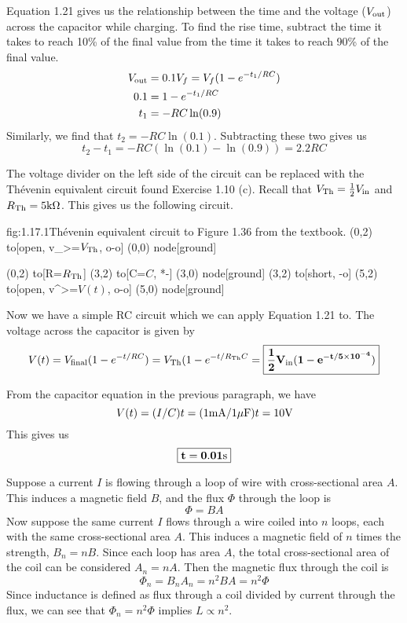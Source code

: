 \documentclass{article}
\begin{document}
    Equation 1.21 gives us the relationship between the time and the voltage ($V_{\text{out}}$) across the capacitor while charging. To find the rise time, subtract the time it takes to reach 10\% of the final value from the time it takes to reach 90\% of the final value.
    \begin{align*}
        V_{\text{out}} &= 0.1V_f = V_f(1-e^{-t_1/RC}) \\
        0.1 &= 1 - e^{-t_1/RC}\\ 
        t_1 &= -RC \ln(0.9)
    \end{align*}
    Similarly, we find that $t_2 = -RC \ln(0.1)$. Subtracting these two gives us 
    \[t_2 - t_1 = -RC(\ln(0.1) - \ln(0.9)) = 2.2RC\]

    The voltage divider on the left side of the circuit can be replaced with the Th\'evenin equivalent circuit found Exercise 1.10 (c). Recall that $V_{\text{Th}} = \frac{1}{2} V_{\text{in}}$ and $R_{\text{Th}} = 5\text{k}\Omega$. This gives us the following circuit.
    \begin{circuit}{fig:1.17.1}{Th\'evenin equivalent circuit to Figure 1.36 from the textbook.}
        (0,2) to[open, v_>=$V_{\text{Th}}$, o-o] (0,0) node[ground]{}
        
        (0,2) to[R=$R_{\text{Th}}$] (3,2)
            to[C=$C$, *-] (3,0) node[ground]{}
        (3,2) to[short, -o] (5,2)
        to[open, v^>=$V(t)$, o-o] (5,0) node[ground]{}
    \end{circuit}

    Now we have a simple RC circuit which we can apply Equation 1.21 to. The voltage across the capacitor is given by 
    \[V(t) = V_\text{final}(1 - e^{-t/RC}) = V_{\text{Th}} (1 - e^{-t/R_{\text{Th}} C} = \boxed{\mathbf{\frac{1}{2}V_{\text{in}} (1 - e^{-t/5 \times 10^{-4}})}}\]


    From the capacitor equation in the previous paragraph, we have 
    \[V(t) = (I/C)t = (1 \text{m}\text{A}/1\mu\text{F})t = 10\text{V}\]
    This gives us
    \[\boxed{\mathbf{t = 0.01\text{s}}}\]

    Suppose a current \(I\) is flowing through a loop of wire with cross-sectional area \(A\).
    This induces a magnetic field \(B\), and the flux \(\Phi\) through the loop is
    \[\Phi = BA\]
    Now suppose the same current \(I\) flows through a wire coiled into \(n\) loops, each with the same cross-sectional area \(A\).
    This induces a magnetic field of \(n\) times the strength, \(B_n = nB\). Since each loop has area \(A\),
    the total cross-sectional area of the coil can be considered \(A_n = nA\). Then the magnetic flux
    through the coil is
    \[\Phi_n = B_nA_n = n^2BA = n^2\Phi\]
    Since inductance is defined as flux through a coil divided by current through the flux,
    we can see that \(\Phi_n = n^2\Phi\) implies \(L \propto n^2\).
\end{document}

